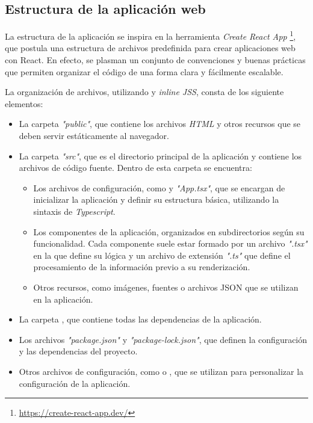 \subsection{Estructura de la aplicación web}

La estructura de la aplicación se inspira en la herramienta \textit{Create React App} \footnote{\url{https://create-react-app.dev/}}, que postula una estructura de archivos predefinida para crear aplicaciones web con React. En efecto, se plasman un conjunto de convenciones y buenas prácticas que permiten organizar el código de una forma clara y fácilmente escalable.

La organización de archivos, utilizando  y \textit{inline JSS}, consta de los siguiente elementos:

\begin{itemize}

  \item La carpeta \textit{"public"}, que contiene los archivos \textit{HTML} y otros recursos que se deben servir estáticamente al navegador.

  \item La carpeta \textit{"src"}, que es el directorio principal de la aplicación y contiene los archivos de código fuente. Dentro de esta carpeta se encuentra:

    \begin{itemize}

      \item Los archivos de configuración, como  y \textit{"App.tsx"}, que se encargan de inicializar la aplicación y definir su estructura básica, utilizando la sintaxis de \textit{Typescript}.
  
      \item Los componentes de la aplicación, organizados en subdirectorios según su funcionalidad. Cada componente suele estar formado por un archivo \textit{".tsx"} en la que define su lógica y un archivo de extensión \textit{".ts"} que define el procesamiento de la información previo a su renderización.

      \item Otros recursos, como imágenes, fuentes o archivos JSON que se utilizan en la aplicación.

    \end{itemize}

  \item La carpeta , que contiene todas las dependencias de la aplicación.

  \item Los archivos \textit{"package.json"} y \textit{"package-lock.json"}, que definen la configuración y las dependencias del proyecto.

  \item Otros archivos de configuración, como  o , que se utilizan para personalizar la configuración de la aplicación.

\end{itemize}


